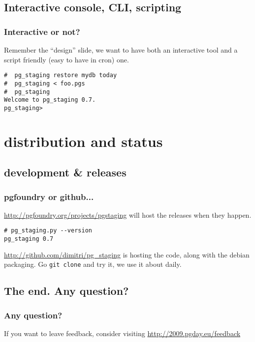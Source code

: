 \documentclass{beamer}
\begin{document}
\subsection{Interactive console, CLI, scripting}
\begin{frame}[fragile]
  \frametitle{Interactive or not?}

  Remember the ``design'' slide, we want to have both an interactive tool
  and a script friendly (easy to have in cron) one.

  \pause

  \begin{example}
  \begin{verbatim}
#  pg_staging restore mydb today
#  pg_staging < foo.pgs
#  pg_staging
Welcome to pg_staging 0.7.
pg_staging> 
  \end{verbatim}
  \end{example}
\end{frame}

\section{distribution and status}
\subsection{development \& releases}

\begin{frame}[fragile]
  \frametitle{pgfoundry or github...}

  \url{http://pgfoundry.org/projects/pgstaging} will host the releases when
  they happen.

  \pause

  \begin{example}
  \begin{verbatim}
# pg_staging.py --version
pg_staging 0.7
  \end{verbatim}
  \end{example}

  \pause

  \url{http://github.com/dimitri/pg_staging} is hosting the code, along with
  the debian packaging. Go \texttt{git clone} and try it, we use it about
  daily.
\end{frame}

\subsection{The end. Any question?}
\begin{frame}[fragile]
  \frametitle{Any question?}


  \linebreak
  \pause

  \begin{center}
  If you want to leave feedback, consider visiting
  \url{http://2009.pgday.eu/feedback}
  \end{center}
\end{frame}
\end{document}
